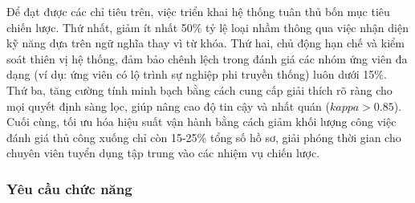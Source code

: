 \documentclass{article}
\begin{document}
Để đạt được các chỉ tiêu trên, việc triển khai hệ thống tuân thủ bốn mục tiêu chiến lược. Thứ nhất, giảm ít nhất 50\% tỷ lệ loại nhầm thông qua việc nhận diện kỹ năng dựa trên ngữ nghĩa thay vì từ khóa. Thứ hai, chủ động hạn chế và kiểm soát thiên vị hệ thống, đảm bảo chênh lệch trong đánh giá các nhóm ứng viên đa dạng (ví dụ: ứng viên có lộ trình sự nghiệp phi truyền thống) luôn dưới 15\%. Thứ ba, tăng cường tính minh bạch bằng cách cung cấp giải thích rõ ràng cho mọi quyết định sàng lọc, giúp nâng cao độ tin cậy và nhất quán ($kappa > 0.85$). Cuối cùng, tối ưu hóa hiệu suất vận hành bằng cách giảm khối lượng công việc đánh giá thủ công xuống chỉ còn 15-25\% tổng số hồ sơ, giải phóng thời gian cho chuyên viên tuyển dụng tập trung vào các nhiệm vụ chiến lược.
\subsubsection{Yêu cầu chức năng}
\end{document}
